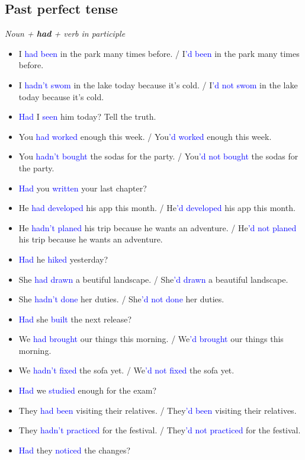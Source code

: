 \subsection{Past perfect tense}
\begin{multicols}{2}
\emph{Noun + \textbf{had} + verb in participle}
\begin{itemize}
\item I \textcolor{blue}{had been} in the park many times before. / I\textcolor{blue}{'d been} in the park many times before.
\item I \textcolor{blue}{hadn't swom} in the lake today because it's cold. / I\textcolor{blue}{'d not swom} in the lake today because it's cold.
\item \textcolor{blue}{Had} I \textcolor{blue}{seen} him today? Tell the truth.
\item You \textcolor{blue}{had worked} enough this week. / You\textcolor{blue}{'d worked} enough this week.
\item You \textcolor{blue}{hadn't bought} the sodas for the party. / You\textcolor{blue}{'d not bought} the sodas for the party.
\item \textcolor{blue}{Had} you \textcolor{blue}{written} your last chapter?
\item He \textcolor{blue}{had developed} his app this month. / He\textcolor{blue}{'d developed} his app this month.
\item He \textcolor{blue}{hadn't planed} his trip because he wants an adventure. / He\textcolor{blue}{'d not planed} his trip because he wants an adventure.
\item \textcolor{blue}{Had} he \textcolor{blue}{hiked} yesterday?
\item She \textcolor{blue}{had drawn} a beutiful landscape. / She\textcolor{blue}{'d drawn} a beautiful landscape.
\item She \textcolor{blue}{hadn't done} her duties. / She\textcolor{blue}{'d not done} her duties.
\item \textcolor{blue}{Had} she \textcolor{blue}{built} the next release?
\item We \textcolor{blue}{had brought} our things this morning. / We\textcolor{blue}{'d brought} our things this morning.
\item We \textcolor{blue}{hadn't fixed} the sofa yet. / We\textcolor{blue}{'d not fixed} the sofa yet.
\item \textcolor{blue}{Had} we \textcolor{blue}{studied} enough for the exam?
\item They \textcolor{blue}{had been} visiting their relatives. / They\textcolor{blue}{'d been} visiting their relatives.
\item They \textcolor{blue}{hadn't practiced} for the festival. / They\textcolor{blue}{'d not practiced} for the festival.
\item \textcolor{blue}{Had} they \textcolor{blue}{noticed} the changes?
\end{itemize}
\end{multicols}

